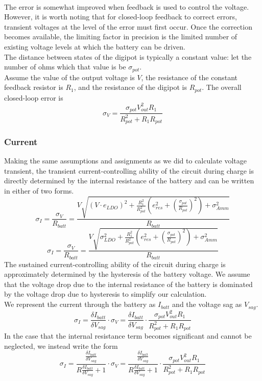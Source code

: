 \documentclass{article}
\begin{document}
\\[12 pt]
The error is somewhat improved when feedback is used to control the voltage. However, it is worth noting that for closed-loop feedback to correct errors, transient voltages at the level of the error must first occur. Once the correction becomes available, the limiting factor in precision is the limited number of existing voltage levels at which the battery can be driven.\\
The distance between states of the digipot is typically a constant value: let the number of ohms which that value is be $\sigma_{pot}$.\\
Assume the value of the output voltage is $V$, the resistance of the constant feedback resistor is $R_1$, and the resistance of the digipot is $R_{pot}$. The overall closed-loop error is
$$\sigma_V = \frac{\sigma_{pot}V_{out}^{2}R_{1}}{R_{pot}^{2}+R_{1}R_{pot}}$$
\subsubsection{Current}
Making the same assumptions and assignments as we did to calculate voltage transient, the transient current-controlling ability of the circuit during charge is directly determined by the internal resistance of the battery and can be written in either of two forms.
$$\sigma_I = \frac{\sigma_V}{R_{batt}} = \frac{V\sqrt{\left(V\cdot e_{LDO}\right)^{2}+\frac{R_{1}^2}{R_{pot}^2}\left(e_{res}^{2}+\left(\frac{\sigma_{pot}}{R_{pot}}\right)^{2}\right)+\sigma_{Amm}^2}}{R_{batt}}$$
$$\sigma_I = \frac{\sigma_V}{R_{batt}} = \frac{V\sqrt{\sigma_{LDO}^{2}+\frac{R_{1}^2}{R_{pot}^2}\left(e_{res}^{2}+\left(\frac{\sigma_{pot}}{R_{pot}}\right)^{2}\right)+\sigma_{Amm}^2}}{R_{batt}}$$
The sustained current-controlling ability of the circuit during charge is approximately determined by the hysteresis of the battery voltage. We assume that the voltage drop due to the internal resistance of the battery is dominated by the voltage drop due to hysteresis to simplify our calculation.\\
We represent the current through the battery as $I_{batt}$ and the voltage sag as $V_{sag}$.
$$\sigma_I = \frac{\delta I_{batt}}{\delta V_{sag}}\cdot \sigma_V = \frac{\delta I_{batt}}{\delta V_{sag}}\cdot \frac{\sigma_{pot}V_{out}^{2}R_{1}}{R_{pot}^{2}+R_{1}R_{pot}}$$
In the case that the internal resistance term becomes significant and cannot be neglected, we  instead write the form
$$\sigma_I = \frac{\frac{\delta I_{batt}}{\delta V_{sag}}}{R\frac{\delta I_{batt}}{\delta V_{sag}}+1}\cdot \sigma_V = \frac{\frac{\delta I_{batt}}{\delta V_{sag}}}{R\frac{\delta I_{batt}}{\delta V_{sag}}+1}\cdot \frac{\sigma_{pot}V_{out}^{2}R_{1}}{R_{pot}^{2}+R_{1}R_{pot}}$$
\end{document}
